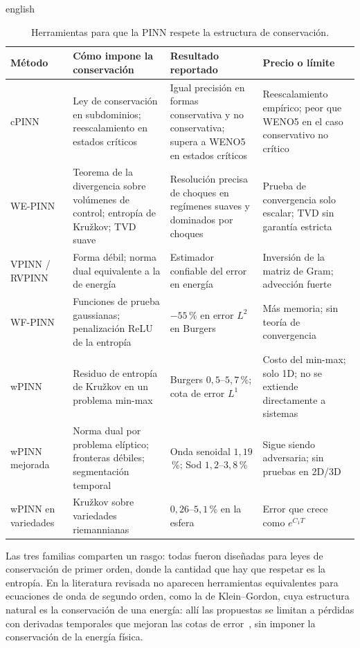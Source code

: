 \documentclass[0000.tex]{subfiles}
\begin{document}
\begin{hyphenrules}{english}
\begin{table}[htbp]
\centering\small
\caption{Herramientas para que la PINN respete la estructura de conservación.}
\label{tab:ea-cons}
\begin{tabularx}{\textwidth}{@{}l >{\raggedright\arraybackslash}X >{\raggedright\arraybackslash}X >{\raggedright\arraybackslash}X@{}}
\toprule
Método & Cómo impone la conservación & Resultado reportado & Precio o límite \\
\midrule
cPINN~\cite{jagtap2020conservative,quita2023conservative} & Ley de conservación en subdominios; reescalamiento en estados críticos & Igual precisión en formas conservativa y no conservativa; supera a WENO5 en estados críticos & Reescalamiento empírico; peor que WENO5 en el caso conservativo no crítico \\
WE-PINN~\cite{oubarka2026weak} & Teorema de la divergencia sobre volúmenes de control; entropía de Kružkov; TVD suave & Resolución precisa de choques en regímenes suaves y dominados por choques & Prueba de convergencia solo escalar; TVD sin garantía estricta \\
VPINN / RVPINN~\cite{kharazmi2019vpinns,rojas2024robust} & Forma débil; norma dual equivalente a la de energía & Estimador confiable del error en energía & Inversión de la matriz de Gram; advección fuerte \\
WF-PINN~\cite{wang2025wf} & Funciones de prueba gaussianas; penalización ReLU de la entropía & $-55$\,\% en error $L^2$ en Burgers & Más memoria; sin teoría de convergencia \\
wPINN~\cite{de2024wpinns} & Residuo de entropía de Kružkov en un problema min-max & Burgers $0{,}5$--$5{,}7$\,\%; cota de error $L^1$ & Costo del min-max; solo 1D; no se extiende directamente a sistemas \\
wPINN mejorada~\cite{chaumet2024improving} & Norma dual por problema elíptico; fronteras débiles; segmentación temporal & Onda senoidal $1{,}19$\,\%; Sod $1{,}2$--$3{,}8$\,\% & Sigue siendo adversaria; sin pruebas en 2D/3D \\
wPINN en variedades~\cite{zhou2025weak} & Kružkov sobre variedades riemannianas & $0{,}26$--$5{,}1$\,\% en la esfera & Error que crece como $e^{C_1T}$ \\
\bottomrule
\end{tabularx}
\end{table}

Las tres familias comparten un rasgo: todas fueron diseñadas para leyes de conservación de primer orden, donde la cantidad que hay que respetar es la entropía. En la literatura revisada no aparecen herramientas equivalentes para ecuaciones de onda de segundo orden, como la de Klein--Gordon, cuya estructura natural es la conservación de una energía: allí las propuestas se limitan a pérdidas con derivadas temporales que mejoran las cotas de error~\cite{qian2023error}, sin imponer la conservación de la energía física.


\end{hyphenrules}
\end{document}
